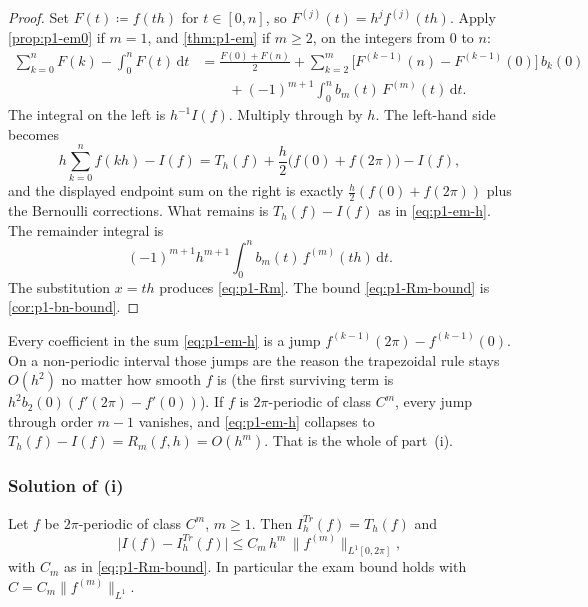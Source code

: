 \begin{proof}
Set \(F(t)\coloneqq f(th)\) for \(t\in[0,n]\), so \(F^{(j)}(t)=h^{j}f^{(j)}(th)\). Apply \cref{prop:p1-em0} if \(m=1\), and \cref{thm:p1-em} if \(m\ge 2\), on the integers from \(0\) to \(n\):
\begin{align*}
\sum_{k=0}^{n} F(k)
-
\int_{0}^{n} F(t)\,\mathrm{d}t
&=
\frac{F(0)+F(n)}{2}
+
\sum_{k=2}^{m}
\bigl[F^{(k-1)}(n)-F^{(k-1)}(0)\bigr]\,b_{k}(0)
\\
&\qquad
+
(-1)^{m+1}
\int_{0}^{n} b_{m}(t)\,F^{(m)}(t)\,\mathrm{d}t.
\end{align*}
The integral on the left is \(h^{-1}I(f)\). Multiply through by \(h\). The left-hand side becomes
\[
h\sum_{k=0}^{n} f(kh)
-
I(f)
=
T_{h}(f)
+
\frac{h}{2}\bigl(f(0)+f(2\pi)\bigr)
-
I(f),
\]
and the displayed endpoint sum on the right is exactly \(\frac{h}{2}(f(0)+f(2\pi))\) plus the Bernoulli corrections. What remains is \(T_{h}(f)-I(f)\) as in \eqref{eq:p1-em-h}. The remainder integral is
\[
(-1)^{m+1}h^{m+1}
\int_{0}^{n}
b_{m}(t)\,f^{(m)}(th)\,\mathrm{d}t.
\]
The substitution \(x=th\) produces \eqref{eq:p1-Rm}. The bound \eqref{eq:p1-Rm-bound} is \cref{cor:p1-bn-bound}.
\end{proof}

\begin{remark}
\label{rem:p1-cancel}
Every coefficient in the sum \eqref{eq:p1-em-h} is a jump \(f^{(k-1)}(2\pi)-f^{(k-1)}(0)\). On a non-periodic interval those jumps are the reason the trapezoidal rule stays \(O(h^{2})\) no matter how smooth \(f\) is (the first surviving term is \(h^{2}b_{2}(0)(f'(2\pi)-f'(0))\)). If \(f\) is \(2\pi\)-periodic of class \(C^{m}\), every jump through order \(m-1\) vanishes, and \eqref{eq:p1-em-h} collapses to \(T_{h}(f)-I(f)=R_{m}(f,h)=O(h^{m})\). That is the whole of part~(i).
\end{remark}

\subsubsection{Solution of (i)}

\begin{theorem}
\label{thm:p1-order-m}
Let \(f\) be \(2\pi\)-periodic of class \(C^{m}\), \(m\ge 1\). Then \(I_{h}^{Tr}(f)=T_{h}(f)\) and
\[
\bigl\lvert I(f)-I_{h}^{Tr}(f)\bigr\rvert
\le
C_{m}\,h^{m}\,\lVert f^{(m)}\rVert_{L^{1}[0,2\pi]},
\]
with \(C_{m}\) as in \eqref{eq:p1-Rm-bound}. In particular the exam bound holds with \(C=C_{m}\lVert f^{(m)}\rVert_{L^{1}}\).
\end{theorem}

